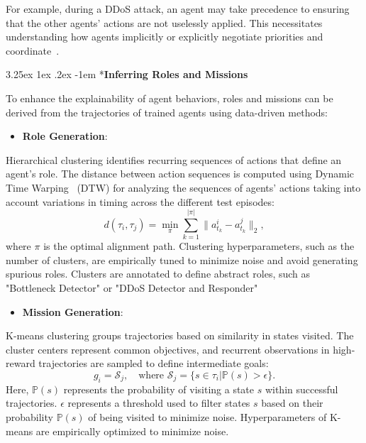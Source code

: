 \documentclass[conference]{IEEEtran}
\makeatletter
\renewcommand\paragraph{\@startsection{paragraph}{5}{\z@}%
  {3.25ex \@plus1ex \@minus.2ex}%
  {-1em}%
  {\normalfont\normalsize\bfseries}}
\makeatother
\begin{document}
For example, during a DDoS attack, an agent may take precedence to ensuring that the other agents' actions are not uselessly applied. This necessitates understanding how agents implicitly or explicitly negotiate priorities and coordinate~\cite{Shoham2008}.

\paragraph*{\textbf{Inferring Roles and Missions}}

To enhance the explainability of agent behaviors, roles and missions can be derived from the trajectories of trained agents using data-driven methods:

\begin{itemize}
    \item \textbf{Role Generation}:
\end{itemize}

\noindent Hierarchical clustering identifies recurring sequences of actions that define an agent's role. The distance between action sequences is computed using Dynamic Time Warping~\cite{berndt1994using} (DTW) for analyzing the sequences of agents' actions taking into account variations in timing across the different test episodes:
\[
d(\tau_i, \tau_j) = \min_{\pi} \sum_{k=1}^{|\pi|} \|a_{t_k}^i - a_{t_k}^j\|_2,
\]
where $\pi$ is the optimal alignment path. Clustering hyperparameters, such as the number of clusters, are empirically tuned to minimize noise and avoid generating spurious roles. Clusters are annotated to define abstract roles, such as "Bottleneck Detector" or "DDoS Detector and Responder"

\begin{itemize}
    \item \textbf{Mission Generation}:
\end{itemize}    

\noindent K-means clustering groups trajectories based on similarity in states visited. The cluster centers represent common objectives, and recurrent observations in high-reward trajectories are sampled to define intermediate goals:
    \[
    g_i = \mathcal{S}_j, \quad \text{where } \mathcal{S}_j = \{s \in \tau_i | \mathbb{P}(s) > \epsilon\}.
    \]
    Here, $\mathbb{P}(s)$ represents the probability of visiting a state $s$ within successful trajectories. $\epsilon$ represents a threshold used to filter states $s$ based on their probability $\mathbb{P}(s)$ of being visited to minimize noise. Hyperparameters of K-means are empirically optimized to minimize noise.
\end{document}
